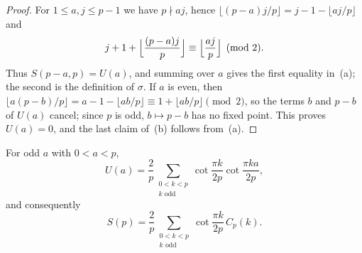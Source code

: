 \begin{proof}
For $1\le a,j\le p-1$ we have $p\nmid aj$, hence $\lfloor(p-a)j/p\rfloor=j-1-\lfloor aj/p\rfloor$ and
\[
j+1+\Bigl\lfloor\frac{(p-a)j}p\Bigr\rfloor\equiv\Bigl\lfloor\frac{aj}p\Bigr\rfloor\pmod2.
\]
Thus $S(p-a,p)=U(a)$, and summing over $a$ gives the first equality in~(a); the second is the definition of $\sigma$. If $a$ is even, then $\lfloor a(p-b)/p\rfloor=a-1-\lfloor ab/p\rfloor\equiv1+\lfloor ab/p\rfloor\pmod2$, so the terms $b$ and $p-b$ of $U(a)$ cancel; since $p$ is odd, $b\mapsto p-b$ has no fixed point. This proves $U(a)=0$, and the last claim of~(b) follows from~(a).
\end{proof}

\begin{lemma}\label{lem:dual}
For odd $a$ with $0<a<p$,
\[
U(a)=\frac2p\sum_{\substack{0<k<p\\ k\text{ odd}}}\cot\frac{\pi k}{2p}\cot\frac{\pi ka}{2p},
\]
and consequently
\begin{equation}\label{eq:dual}
S(p)=\frac2p\sum_{\substack{0<k<p\\ k\text{ odd}}}\cot\frac{\pi k}{2p}\,C_p(k).
\end{equation}
\end{lemma}

